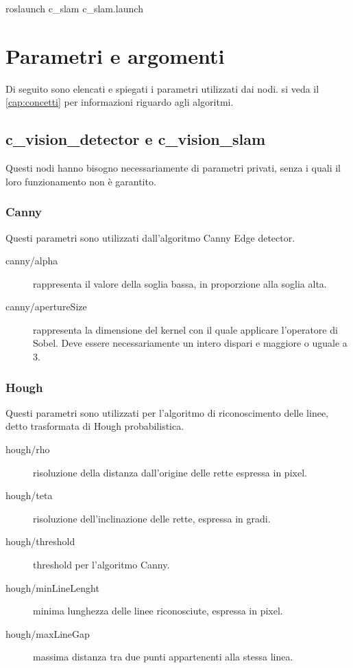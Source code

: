 roslaunch c\_slam c\_slam.launch




\section{Parametri e argomenti}

Di seguito sono elencati e spiegati i parametri utilizzati dai nodi. si veda il \autoref{cap:concetti} per informazioni riguardo agli algoritmi.

\subsection{c\_vision\_detector e c\_vision\_slam}

Questi nodi hanno bisogno necessariamente di parametri privati, senza i quali il loro funzionamento non è garantito.

\subsubsection{Canny}

Questi parametri sono utilizzati dall'algoritmo Canny Edge detector.

\begin{description}
 \item [canny/alpha] rappresenta il valore della soglia bassa, in proporzione alla soglia alta.
 \item [canny/apertureSize] rappresenta la dimensione del kernel con il quale applicare l'operatore di Sobel. Deve essere necessariamente un intero dispari e maggiore o uguale a 3. 
\end{description}

\subsubsection{Hough}

Questi parametri sono utilizzati per l'algoritmo di riconoscimento delle linee, detto trasformata di Hough probabilistica.

\begin{description}
 \item [hough/rho] risoluzione della distanza dall'origine delle rette espressa in pixel.
 \item [hough/teta] risoluzione dell'inclinazione delle rette, espressa in gradi.
 \item [hough/threshold] threshold per l'algoritmo Canny.
 \item [hough/minLineLenght] minima lunghezza delle linee riconosciute, espressa in pixel.
 \item [hough/maxLineGap] massima distanza tra due punti appartenenti alla stessa linea.
\end{description}

